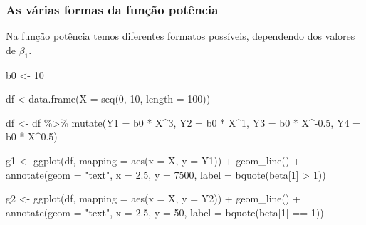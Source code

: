 \documentclass[
]{book}
\newenvironment{Shaded}{\begin{snugshade}}{\end{snugshade}}
\newcommand{\AttributeTok}[1]{\textcolor[rgb]{0.77,0.63,0.00}{#1}}
\newcommand{\DecValTok}[1]{\textcolor[rgb]{0.00,0.00,0.81}{#1}}
\newcommand{\FloatTok}[1]{\textcolor[rgb]{0.00,0.00,0.81}{#1}}
\newcommand{\FunctionTok}[1]{\textcolor[rgb]{0.00,0.00,0.00}{#1}}
\newcommand{\NormalTok}[1]{#1}
\newcommand{\OtherTok}[1]{\textcolor[rgb]{0.56,0.35,0.01}{#1}}
\newcommand{\SpecialCharTok}[1]{\textcolor[rgb]{0.00,0.00,0.00}{#1}}
\newcommand{\StringTok}[1]{\textcolor[rgb]{0.31,0.60,0.02}{#1}}
\begin{document}
\hypertarget{as-vuxe1rias-formas-da-funuxe7uxe3o-potuxeancia}{%
\subsubsection*{As várias formas da função potência}\label{as-vuxe1rias-formas-da-funuxe7uxe3o-potuxeancia}}

Na função potência temos diferentes formatos possíveis, dependendo dos valores de \(\beta_1\).

\begin{Shaded}
\begin{Highlighting}[]
\NormalTok{b0 }\OtherTok{\textless{}{-}} \DecValTok{10}

\NormalTok{df }\OtherTok{\textless{}{-}}\FunctionTok{data.frame}\NormalTok{(}\AttributeTok{X =} \FunctionTok{seq}\NormalTok{(}\DecValTok{0}\NormalTok{, }\DecValTok{10}\NormalTok{, }\AttributeTok{length =} \DecValTok{100}\NormalTok{))}

\NormalTok{df }\OtherTok{\textless{}{-}}\NormalTok{ df }\SpecialCharTok{\%\textgreater{}\%} 
  \FunctionTok{mutate}\NormalTok{(}\AttributeTok{Y1 =}\NormalTok{ b0 }\SpecialCharTok{*}\NormalTok{ X}\SpecialCharTok{\^{}}\DecValTok{3}\NormalTok{,}
         \AttributeTok{Y2 =}\NormalTok{ b0 }\SpecialCharTok{*}\NormalTok{ X}\SpecialCharTok{\^{}}\DecValTok{1}\NormalTok{,}
         \AttributeTok{Y3 =}\NormalTok{ b0 }\SpecialCharTok{*}\NormalTok{ X}\SpecialCharTok{\^{}{-}}\FloatTok{0.5}\NormalTok{,}
         \AttributeTok{Y4 =}\NormalTok{ b0 }\SpecialCharTok{*}\NormalTok{ X}\SpecialCharTok{\^{}}\FloatTok{0.5}\NormalTok{)}

\NormalTok{g1 }\OtherTok{\textless{}{-}} \FunctionTok{ggplot}\NormalTok{(df, }\AttributeTok{mapping =} \FunctionTok{aes}\NormalTok{(}\AttributeTok{x =}\NormalTok{ X, }\AttributeTok{y =}\NormalTok{ Y1)) }\SpecialCharTok{+}
  \FunctionTok{geom\_line}\NormalTok{() }\SpecialCharTok{+}
  \FunctionTok{annotate}\NormalTok{(}\AttributeTok{geom =} \StringTok{"text"}\NormalTok{, }\AttributeTok{x =} \FloatTok{2.5}\NormalTok{, }\AttributeTok{y =} \DecValTok{7500}\NormalTok{, }
           \AttributeTok{label =} \FunctionTok{bquote}\NormalTok{(beta[}\DecValTok{1}\NormalTok{] }\SpecialCharTok{\textgreater{}} \DecValTok{1}\NormalTok{))}

\NormalTok{g2 }\OtherTok{\textless{}{-}} \FunctionTok{ggplot}\NormalTok{(df, }\AttributeTok{mapping =} \FunctionTok{aes}\NormalTok{(}\AttributeTok{x =}\NormalTok{ X, }\AttributeTok{y =}\NormalTok{ Y2)) }\SpecialCharTok{+}
  \FunctionTok{geom\_line}\NormalTok{() }\SpecialCharTok{+}
  \FunctionTok{annotate}\NormalTok{(}\AttributeTok{geom =} \StringTok{"text"}\NormalTok{, }\AttributeTok{x =} \FloatTok{2.5}\NormalTok{, }\AttributeTok{y =} \DecValTok{50}\NormalTok{, }
           \AttributeTok{label =} \FunctionTok{bquote}\NormalTok{(beta[}\DecValTok{1}\NormalTok{] }\SpecialCharTok{==} \DecValTok{1}\NormalTok{))}


\end{Highlighting}
\end{Shaded}
\end{document}
